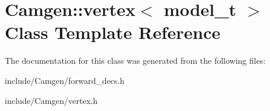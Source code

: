 \hypertarget{a00565}{\section{Camgen\-:\-:vertex$<$ model\-\_\-t $>$ Class Template Reference}
\label{a00565}
}


The documentation for this class was generated from the following files\-:\begin{DoxyCompactItemize}
\item 
include/\-Camgen/forward\-\_\-decs.\-h\item 
include/\-Camgen/vertex.\-h\end{DoxyCompactItemize}

